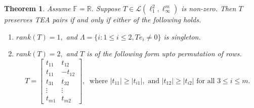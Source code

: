 \documentclass{amsart}
\newtheorem{theorem}{Theorem}[section]
\theoremstyle{definition}
\theoremstyle{remark}
\numberwithin{equation}{section}
\begin{document}
 \begin{theorem}\label{th-tear}
 	Assume $\mathbb{F}=\mathbb{R}.$ Suppose $T\in\mathcal{L}(\ell_1^2,\ell_\infty^m)$ is non-zero.   Then $T$ preserves TEA pairs if and only if either of the following holds.
 	\begin{enumerate}
 		\item $rank(T)=1,$ and $\Lambda=\{i:1\leq i\leq 2,Te_i\neq 0\}$ is singleton.
 		\item $rank(T)=2,$ and 	$T$ is of the following form upto permutation of rows.
 		\[	T=\begin{bmatrix}
 			t_{11}&t_{12}\\
 			t_{11}&-t_{12}\\
 			t_{31}&t_{32}\\
 			\vdots&\vdots\\
 			t_{m1}&t_{m2}
 		\end{bmatrix}, ~\text{ where }|t_{11}|\geq |t_{i1}|, \text{ and }|t_{12}|\geq |t_{i2}| \text{ for all }3\leq i\leq m. \] 
 		\end{enumerate}
 \end{theorem}
\end{document}
